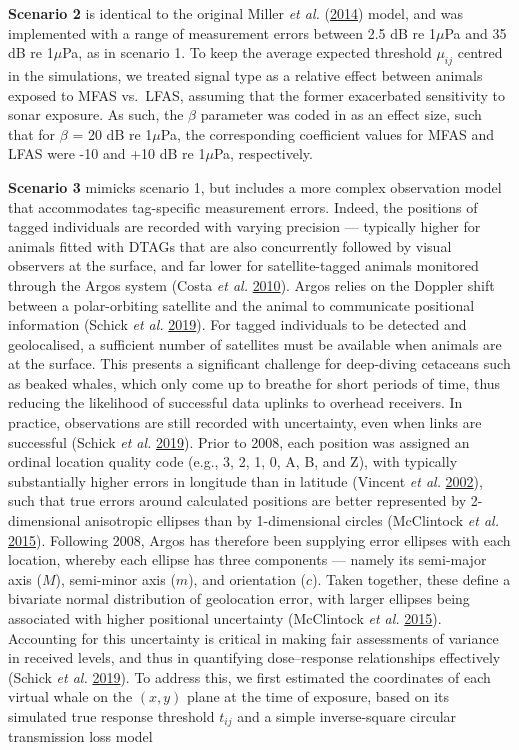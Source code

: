 \documentclass[
]{article}
\begin{document}
\textbf{Scenario 2} is identical to the original Miller \emph{et al.} (\protect\hyperlink{ref-Miller2014}{2014}) model, and was implemented with a range of measurement errors between 2.5 dB re 1\(\mu\)Pa and 35 dB re 1\(\mu\)Pa, as in scenario 1. To keep the average expected threshold \(\mu_{ij}\) centred in the simulations, we treated signal type as a relative effect between animals exposed to MFAS vs.~LFAS, assuming that the former exacerbated sensitivity to sonar exposure. As such, the \(\beta\) parameter was coded in as an effect size, such that for \(\beta\) = 20 dB re 1\(\mu\)Pa, the corresponding coefficient values for MFAS and LFAS were -10 and +10 dB re 1\(\mu\)Pa, respectively.

\textbf{Scenario 3} mimicks scenario 1, but includes a more complex observation model that accommodates tag-specific measurement errors. Indeed, the positions of tagged individuals are recorded with varying precision --- typically higher for animals fitted with DTAGs that are also concurrently followed by visual observers at the surface, and far lower for satellite-tagged animals monitored through the Argos system (Costa \emph{et al.} \protect\hyperlink{ref-Costa2010}{2010}). Argos relies on the Doppler shift between a polar-orbiting satellite and the animal to communicate positional information (Schick \emph{et al.} \protect\hyperlink{ref-Schick2019}{2019}). For tagged individuals to be detected and geolocalised, a sufficient number of satellites must be available when animals are at the surface. This presents a significant challenge for deep-diving cetaceans such as beaked whales, which only come up to breathe for short periods of time, thus reducing the likelihood of successful data uplinks to overhead receivers. In practice, observations are still recorded with uncertainty, even when links are successful (Schick \emph{et al.} \protect\hyperlink{ref-Schick2019}{2019}). Prior to 2008, each position was assigned an ordinal location quality code (e.g., 3, 2, 1, 0, A, B, and Z), with typically substantially higher errors in longitude than in latitude (Vincent \emph{et al.} \protect\hyperlink{ref-Vincent2002}{2002}), such that true errors around calculated positions are better represented by 2-dimensional anisotropic ellipses than by 1-dimensional circles (McClintock \emph{et al.} \protect\hyperlink{ref-McClintock2015}{2015}). Following 2008, Argos has therefore been supplying error ellipses with each location, whereby each ellipse has three components --- namely its semi-major axis (\(M\)), semi-minor axis (\(m\)), and orientation (\(c\)). Taken together, these define a bivariate normal distribution of geolocation error, with larger ellipses being associated with higher positional uncertainty (McClintock \emph{et al.} \protect\hyperlink{ref-McClintock2015}{2015}). Accounting for this uncertainty is critical in making fair assessments of variance in received levels, and thus in quantifying dose--response relationships effectively (Schick \emph{et al.} \protect\hyperlink{ref-Schick2019}{2019}). To address this, we first estimated the coordinates of each virtual whale on the \((x,y)\) plane at the time of exposure, based on its simulated true response threshold \(t_{ij}\) and a simple inverse-square circular transmission loss model 
\end{document}
